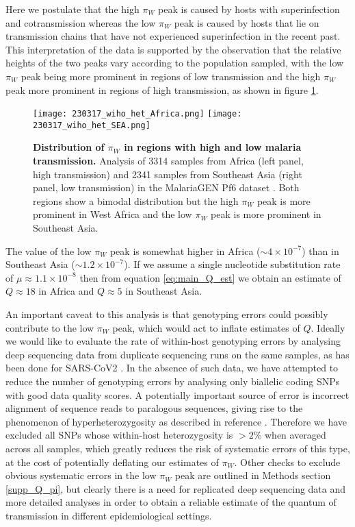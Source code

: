 \documentclass[_main.tex]{subfiles}
\begin{document}
Here we postulate that the high $\pi_W$ peak is caused by hosts with superinfection and cotransmission whereas the low $\pi_W$ peak is caused by hosts that lie on transmission chains that have not experienced superinfection in the recent past.  This interpretation of the data is supported by the observation that the relative heights of the two peaks vary according to the population sampled, with the low $\pi_W$ peak being more prominent in regions of low transmission and the high $\pi_W$ peak more prominent in regions of high transmission, as shown in figure \ref{fig:main_pi_w_regional}. 

\begin{figure}[h!]
\centering
\texttt{[image: 230317\_wiho\_het\_Africa.png]}
\texttt{[image: 230317\_wiho\_het\_SEA.png]}
\caption{
\textbf{Distribution of $\pi_W$ in regions with high and low malaria transmission.}  Analysis of 3314 samples from Africa (left panel, high transmission) and 2341 samples from Southeast Asia (right panel, low transmission) in the MalariaGEN  Pf6 dataset \cite{MalariaGEN2021}.  Both regions show a bimodal distribution but the high $\pi_W$ peak is more prominent in West Africa and the low $\pi_W$ peak is more prominent in Southeast Asia.
}
\label{fig:main_pi_w_regional}
\end{figure}

The value of the low $\pi_W$ peak is somewhat higher in Africa ($\sim4 \times 10^{-7}$) than in Southeast Asia ($\sim1.2 \times 10^{-7}$).  If we assume a single nucleotide substitution rate of $\mu \approx 1.1 \times 10^{-8}$ then from equation \ref{eq:main_Q_est} we obtain an estimate of $Q \approx 18$ in Africa and $Q \approx 5$ in Southeast Asia.

An important caveat to this analysis is that genotyping errors could possibly contribute to the low $\pi_W$ peak, which would act to inflate estimates of $Q$.  Ideally we would like to evaluate the rate of within-host genotyping errors by analysing deep sequencing data from duplicate sequencing runs on the same samples, as has been done for SARS-CoV2 \cite{Tonkin-Hill2021}.  In the absence of such data, we have attempted to reduce the number of genotyping errors by analysing only biallelic coding SNPs with good data quality scores.  A potentially important source of error is incorrect alignment of sequence reads to paralogous sequences, giving rise to the phenomenon of hyperheterozygosity as described in reference \cite{Manske2012}.  Therefore we have excluded all SNPs whose within-host heterozygosity is $>2\%$ when averaged across all samples, which greatly reduces the risk of systematic errors of this type, at the cost of potentially deflating our estimates of $\pi_W$.  Other checks to exclude obvious systematic errors in the low $\pi_W$ peak are outlined in Methods section \ref{supp_Q_pi}, but clearly there is a need for replicated deep sequencing data and more detailed analyses in order to obtain a reliable estimate of the quantum of transmission in different epidemiological settings.  
\end{document}
